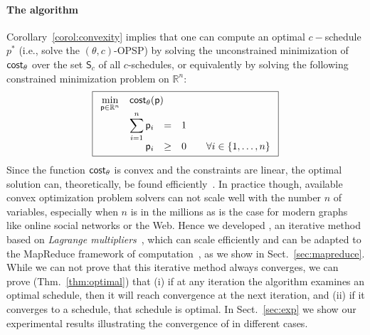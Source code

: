 \paragraph{The algorithm}
Corollary~\ref{corol:convexity} implies that one can compute an optimal
$c-$schedule $p^*$ (i.e., solve the $(\theta,c)$-OPSP) by solving the
unconstrained minimization of $\mathsf{cost}_\theta$ over the set $\mathsf{S}_c$ of all
$c$-schedules, or equivalently by solving the following constrained minimization
problem on $\mathbb{R}^n$:
\begin{equation}\label{eq:optimization}
	\boxed{
	\begin{array}{rrclcl}
	\displaystyle \min_{\sched\in\mathbb{R}^n} & \multicolumn{3}{l}{\cost_\theta(\sched)} \\
	&\displaystyle \sum_{i=1}^{n} \sched_i & = & 1 \\
	&\sched_i & \geq & 0 & & \forall i \in \{1,\ldots,n\} \\
	\end{array} }
\end{equation}
Since the function $\mathsf{cost}_\theta$ is convex and the constraints are linear, the
optimal solution can, theoretically, be found efficiently~\citep{BoydV04}. In
practice though, available convex optimization problem solvers can not scale
well with the number $n$ of variables, especially when $n$ is in the millions
as is the case for modern graphs like online social networks or the Web. Hence
we developed \algoname, an iterative method based on \emph{Lagrange
multipliers}~\citep[Sect.~5.1]{BoydV04}, which can scale efficiently and can be
adapted to the MapReduce framework of computation~\citep{dean2008mapreduce}, as
we show in Sect.~\ref{sec:mapreduce}. While we can not prove that this iterative
method always converges, we can prove (Thm.~\ref{thm:optimal}) that (i) if at
any iteration the algorithm examines an optimal schedule, then it will reach
convergence at the next iteration, and (ii) if it converges to a schedule, that
schedule is optimal. In Sect.~\ref{sec:exp} we show our experimental results
illustrating the convergence of \algoname in different cases.

